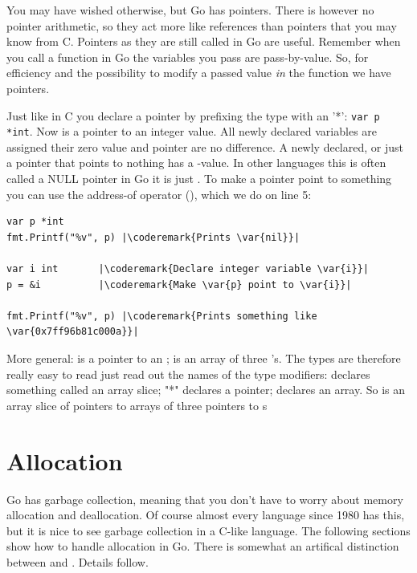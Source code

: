 \noindent{}
You may have wished otherwise, but Go has pointers.
There is however no pointer arithmetic, so they act more like
references than pointers that you may know from C. Pointers as
they are still called in Go are useful.
Remember when you call a function in Go the variables you pass are
pass-by-value. So, for efficiency and the possibility to modify a
passed value \emph{in} the function we have pointers.

Just like in C you declare a pointer by prefixing the type with an '*':
\lstinline{var p *int}. Now  is a pointer to an integer value.
All newly declared variables are assigned their zero value and pointer
are no difference. A newly declared, or just a pointer that points to
nothing has a -value. In other languages this is often called
a NULL pointer in Go it is just . To make 
a pointer point to something you can use the address-of operator
(\func{\&}), which we do on line 5:
\begin{lstlisting}[caption=Make use of a pointer,numbers=right,label=src:pointers]
var p *int	    
fmt.Printf("%v", p) |\coderemark{Prints \var{nil}}|

var i int	    |\coderemark{Declare integer variable \var{i}}|
p = &i		    |\coderemark{Make \var{p} point to \var{i}}|

fmt.Printf("%v", p) |\coderemark{Prints something like \var{0x7ff96b81c000a}}|
\end{lstlisting}

More general:  is a pointer to an ;  is an
array of three 's. The
types are therefore really easy to read just read out the names of the
type modifiers: \type{[]} declares something called an array slice; "*"
declares a pointer; \type{[size]} declares an array. So
 is an array slice of pointers to arrays of three
pointers to s

\section{Allocation}
Go has garbage collection, meaning that you don't have to worry about
memory allocation and deallocation. Of course almost every language
since 1980 has this, but it is nice to see garbage collection in a
C-like language. The following sections show how to handle allocation
in Go. There is somewhat an artifical distinction between
 and . Details follow.

